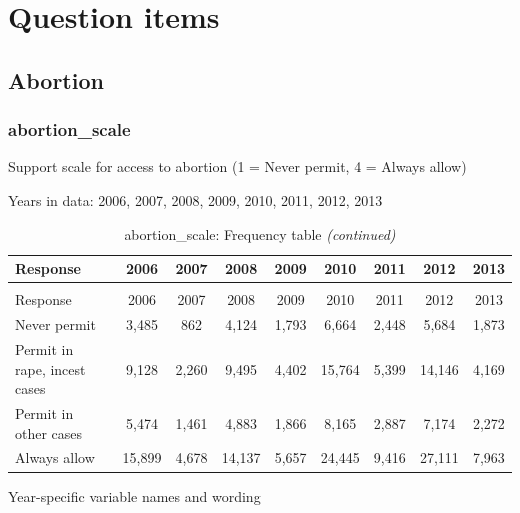 \documentclass[
  12pt]{article}
\begin{document}
\newpage

\tableofcontents

\newpage

\hypertarget{question-items}{%
\section{Question items}\label{question-items}}

\hypertarget{abortion}{%
\subsection{Abortion}\label{abortion}}

\hypertarget{abortion_scale}{%
\subsubsection{abortion\_scale}\label{abortion_scale}}

Support scale for access to abortion (1 = Never permit, 4 = Always
allow)

Years in data: 2006, 2007, 2008, 2009, 2010, 2011, 2012,
2013\begingroup\fontsize{10}{12}\selectfont

\begin{longtable}[t]{lcccccccc}
\caption{\label{tab:unnamed-chunk-5}abortion\_scale: Frequency table}\\
\toprule
Response & 2006 & 2007 & 2008 & 2009 & 2010 & 2011 & 2012 & 2013\\
\midrule
\endfirsthead
\caption[]{abortion\_scale: Frequency table \textit{(continued)}}\\
\toprule
Response & 2006 & 2007 & 2008 & 2009 & 2010 & 2011 & 2012 & 2013\\
\midrule
\endhead

\endfoot
\bottomrule
\endlastfoot
Never permit & 3,485 & 862 & 4,124 & 1,793 & 6,664 & 2,448 & 5,684 & 1,873\\
Permit in rape, incest cases & 9,128 & 2,260 & 9,495 & 4,402 & 15,764 & 5,399 & 14,146 & 4,169\\
Permit in other cases & 5,474 & 1,461 & 4,883 & 1,866 & 8,165 & 2,887 & 7,174 & 2,272\\
Always allow & 15,899 & 4,678 & 14,137 & 5,657 & 24,445 & 9,416 & 27,111 & 7,963\\*
\end{longtable}
\endgroup{}

Year-specific variable names and
wording\begingroup\fontsize{11}{13}\selectfont
\end{document}
